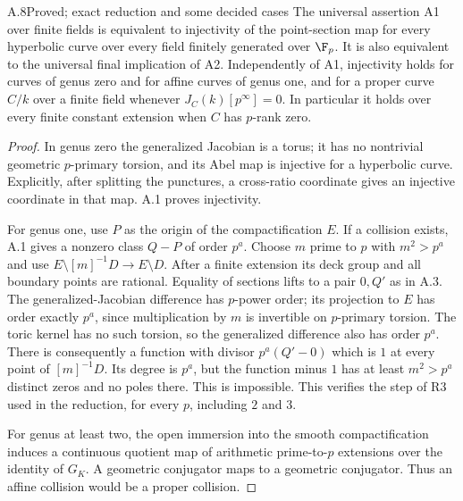 \begin{claim}{A.8}{Proved; exact reduction and some decided cases}
The universal assertion A1 over finite fields is equivalent to
injectivity of the point-section map for every hyperbolic curve
over every field finitely generated over $\F_p$. It is also
equivalent to the universal final implication of A2. Independently
of A1, injectivity holds for curves of genus zero and for affine
curves of genus one, and for a proper curve $C/k$ over a finite
field whenever $J_C(k)[p^\infty]=0$. In particular it holds over
every finite constant extension when $C$ has $p$-rank zero.
\end{claim}
\begin{proof}
In genus zero the generalized Jacobian is a torus; it has no
nontrivial geometric $p$-primary torsion, and its Abel map is
injective for a hyperbolic curve. Explicitly, after splitting the
punctures, a cross-ratio coordinate gives an injective coordinate
in that map. A.1 proves injectivity.

For genus one, use $P$ as the origin of the compactification $E$.
If a collision exists, A.1 gives a nonzero class $Q-P$ of order
$p^a$. Choose $m$ prime to $p$ with $m^2>p^a$ and use
$E\setminus[m]^{-1}D\to E\setminus D$.
After a finite extension its deck group and all boundary points
are rational. Equality of sections lifts to a pair $0,Q'$ as in
A.3. The generalized-Jacobian difference has $p$-power order;
its projection to $E$ has order exactly $p^a$, since multiplication
by $m$ is invertible on $p$-primary torsion. The toric kernel has
no such torsion, so the generalized difference also has order
$p^a$. There is consequently a function with divisor
$p^a(Q'-0)$ which is $1$ at every point of $[m]^{-1}D$.
Its degree is $p^a$, but the function minus $1$ has at least
$m^2>p^a$ distinct zeros and no poles there. This is impossible.
This verifies the step of R3 used in the reduction, for every $p$,
including $2$ and $3$.

For genus at least two, the open immersion into the smooth
compactification induces a continuous quotient map of arithmetic
prime-to-$p$ extensions over the identity of $G_K$. A geometric
conjugator maps to a geometric conjugator. Thus an affine collision
would be a proper collision.


\end{proof}
